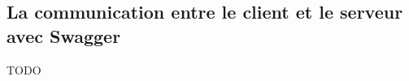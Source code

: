 \subsection{La communication entre le client et le serveur avec Swagger}
\label{subsec:rest-swagger-api}
TODO